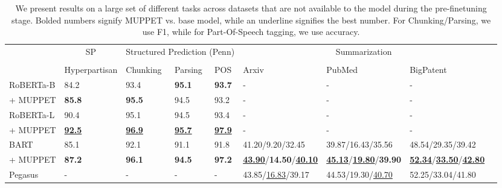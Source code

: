 \documentclass[11pt,a4paper]{article}
\begin{document}
\begin{table*}[th]
\centering
\small
\begin{tabular}{@{}lllll|llll@{}}
\toprule
 & \multicolumn{1}{c}{SP} & \multicolumn{3}{c}{Structured Prediction (Penn)} & \multicolumn{3}{c}{Summarization}\\
 \cmidrule(lr){2-2}\cmidrule(lr){3-5}\cmidrule(lr){6-8} \\
 & 
  Hyperpartisan &
  Chunking &
  Parsing &
  POS & 
  Arxiv & 
  PubMed      & 
  BigPatent\\ \midrule

RoBERTa-B   & 84.2       & 93.4 & \textbf{95.1}     & \textbf{93.7}  & - & - &-  \\
 \quad\quad + MUPPET        & \textbf{85.8}         &   \textbf{95.5}        &  94.5                    & 93.2  & - & - &- \\
RoBERTa-L & 90.4   &  95.1 & 94.5        &     93.4  & - & - &-         \\
\quad\quad + MUPPET        & \textbf{\underline{92.5}}         &  \textbf{\underline{96.9}}    &   \textbf{\underline{95.7}}        &    \textbf{\underline{97.9}}  & - & - &-	
   \\ \midrule
BART & 85.1       & {92.1}     & {91.1}      & {91.8}   & 41.20/9.20/32.45 & 39.87/16.43/35.56 & 48.54/29.35/39.42       \\
\quad\quad + MUPPET        & \textbf{87.2}       & \textbf{96.1}     & \textbf{94.5}      & \textbf{97.2}   & \textbf{\underline{43.90}}/\textbf{14.50}/\textbf{\underline{40.10}} & \textbf{\underline{45.13}}/\textbf{\underline{19.80}}/\textbf{39.90} & \textbf{\underline{52.34}}/\textbf{\underline{33.50}}/\textbf{\underline{42.80}}       \\ \midrule
Pegasus 
& - & - & - & - & 43.85/\underline{16.83}/39.17 & 44.53/19.30/\underline{40.70} & 52.25/33.04/41.80 \\
\bottomrule
\end{tabular}
\caption{We present results on a large set of different tasks across datasets that are not available to the model during the pre-finetuning stage. Bolded numbers signify MUPPET vs. base model, while an underline signifies the best number. For Chunking/Parsing, we use F1, while for Part-Of-Speech tagging, we use accuracy.}
\label{table:mtl_out_of_mtl}
\end{table*}
\end{document}
